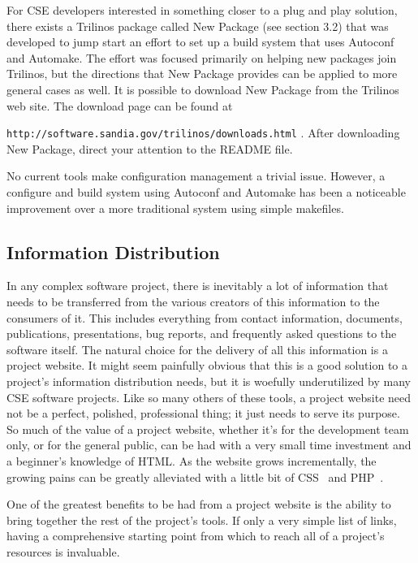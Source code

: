 \documentclass[12pt,relax]{article}
\newcommand{\InlineDirectory}[1]{
  {\hspace{0.01 in}} {\tt #1} {\hspace{0.01 in}}}
\begin{document}
For CSE developers interested in something closer to a plug and play solution,
there exists a Trilinos package called New Package (see section 3.2) that was
developed to jump start an effort to set up a build system that uses Autoconf
and Automake.  The effort was focused primarily on helping new packages join
Trilinos, but the directions that New Package provides can be applied to more
general cases as well.  It is possible to download New Package from the
Trilinos web site.  The download page can be found at \newline
\InlineDirectory{http://software.sandia.gov/trilinos/downloads.html}.  After
downloading New Package, direct your attention to the README file.

No current tools make configuration management a trivial issue.  However, a
configure and build system using Autoconf and Automake has been a
noticeable improvement over a more traditional system using simple makefiles.

\subsection{Information Distribution}


In any complex software project, there is inevitably a lot of information that
needs to be transferred from the various creators of this information to the
consumers of it.  This includes everything from contact information,
documents, publications, presentations, bug reports, and frequently asked
questions to the software itself.  The natural choice for the delivery of all
this information is a project website.  It might seem painfully obvious that
this is a good solution to a project's information distribution needs, but it
is woefully underutilized by many CSE software projects.  Like so many others
of these tools, a project website need not be a perfect, polished, professional
thing; it just needs to serve its purpose.  So much of the value of a project
website, whether it's for the development team only, or for the general
public, can be had with a very small time investment and a beginner's
knowledge of HTML.  As the website grows incrementally, the growing pains can
be greatly alleviated with a little bit of CSS~\cite{CSS} and PHP~\cite{PHP}.

One of the greatest benefits to be had from a project website is the ability to
bring together the rest of the project's tools.  If only a very simple list of
links, having a comprehensive starting point from which to reach all of a
project's resources is invaluable.
\end{document}
